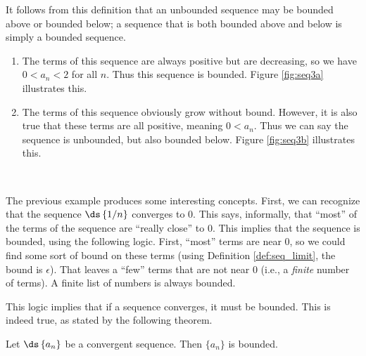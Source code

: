 \enlargethispage{2\baselineskip}
It follows from this definition that an unbounded sequence may be bounded above or bounded below; a sequence that is both bounded above and below is simply a bounded sequence.\\

{\begin{enumerate}
\item		The terms of this sequence are always positive but are decreasing, so we have $0<a_n<2$ for all $n$. Thus this sequence is bounded. Figure \ref{fig:seq3a} illustrates this.


\item		The terms of this sequence obviously grow without bound. However, it is also true that these terms are all positive, meaning $0<a_n$. Thus we can say the sequence is unbounded, but also bounded below. Figure \ref{fig:seq3b} illustrates this.

\end{enumerate}
 \baselineskip
}\\


The previous example produces some interesting concepts. First, we can recognize that the sequence $\ds\left\{1/n\right\}$ converges to 0. This says, informally, that ``most'' of the terms of the sequence are ``really close'' to 0. This implies that the sequence is bounded, using the following logic. First, ``most'' terms are near 0, so we could find some sort of bound on these terms (using Definition \ref{def:seq_limit}, the bound is $\epsilon$). That leaves a ``few'' terms that are not near 0 (i.e., a \emph{finite} number of terms). A finite list of numbers is always bounded. 

This logic implies that if a sequence converges, it must be bounded. This is indeed true, as stated by the following theorem.

{Let $\ds \left\{a_n\right\}$ be a convergent sequence. Then $\{a_n\}$ is bounded.
}

